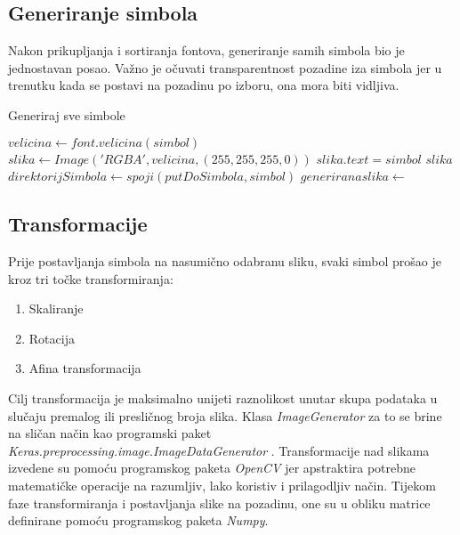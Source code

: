 \subsection{Generiranje simbola}
Nakon prikupljanja i sortiranja fontova, generiranje samih simbola bio je jednostavan posao.
Važno je očuvati transparentnost pozadine iza simbola jer u trenutku kada se postavi na pozadinu po izboru, ona mora biti vidljiva.
\begin{algorithm}
\caption{Generiraj sve simbole}
\begin{algorithmic}[1]
		\State $velicina \gets font.velicina(simbol)$
		\State $slika \gets Image('RGBA', velicina, (255, 255, 255, 0))$
		\State $slika.text = simbol$
		\State \Return $slika$
	\EndFunction
				\State $direktorijSimbola \leftarrow spoji(putDoSimbola, simbol)$
					\State {}
				\EndIf
				\State $generirana slika \gets$ 
				\State {}
			\EndFor
		\EndFor
	\EndFunction
\end{algorithmic}
\end{algorithm}

\subsection{Transformacije}
Prije postavljanja simbola na nasumično odabranu sliku, svaki simbol prošao je kroz tri točke transformiranja:
\begin{enumerate}
\item Skaliranje
\item Rotacija
\item Afina transformacija
\end{enumerate}
Cilj transformacija je maksimalno unijeti raznolikost unutar skupa podataka u slučaju premalog ili presličnog broja slika.
Klasa \emph{ImageGenerator} za to se brine na sličan način kao programski paket \emph{Keras.preprocessing.image.ImageDataGenerator} \cite{Keras.io}.
Transformacije nad slikama izvedene su pomoću programskog paketa \emph{OpenCV} \cite{OpenCV} jer apstraktira potrebne matematičke operacije na razumljiv, lako koristiv i prilagodljiv način.
Tijekom faze transformiranja i postavljanja slike na pozadinu, one su u obliku matrice definirane pomoću programskog paketa \emph{Numpy}.
